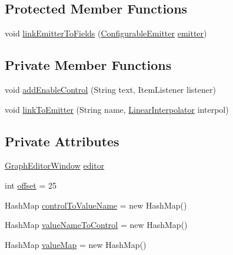 \subsection*{Protected Member Functions}
\begin{DoxyCompactItemize}
\item 
void \mbox{\hyperlink{classorg_1_1newdawn_1_1slick_1_1tools_1_1peditor_1_1_whiskas_panel_a71a90d8afe5a7f2eefc72aecc4b07640}{link\+Emitter\+To\+Fields}} (\mbox{\hyperlink{classorg_1_1newdawn_1_1slick_1_1particles_1_1_configurable_emitter}{Configurable\+Emitter}} \mbox{\hyperlink{classorg_1_1newdawn_1_1slick_1_1tools_1_1peditor_1_1_control_panel_aaa170169fa574cb6b271f782afcd2517}{emitter}})
\end{DoxyCompactItemize}
\subsection*{Private Member Functions}
\begin{DoxyCompactItemize}
\item 
void \mbox{\hyperlink{classorg_1_1newdawn_1_1slick_1_1tools_1_1peditor_1_1_whiskas_panel_aa9cd100f0001b41516cb06b9c6903b7a}{add\+Enable\+Control}} (String text, Item\+Listener listener)
\item 
void \mbox{\hyperlink{classorg_1_1newdawn_1_1slick_1_1tools_1_1peditor_1_1_whiskas_panel_aa8fd4ce760ea12d13153842f6dc4c902}{link\+To\+Emitter}} (String name, \mbox{\hyperlink{classorg_1_1newdawn_1_1slick_1_1particles_1_1_configurable_emitter_1_1_linear_interpolator}{Linear\+Interpolator}} interpol)
\end{DoxyCompactItemize}
\subsection*{Private Attributes}
\begin{DoxyCompactItemize}
\item 
\mbox{\hyperlink{classorg_1_1newdawn_1_1slick_1_1tools_1_1peditor_1_1_graph_editor_window}{Graph\+Editor\+Window}} \mbox{\hyperlink{classorg_1_1newdawn_1_1slick_1_1tools_1_1peditor_1_1_whiskas_panel_adafc0fc72d0d368d6298c3c44e4fa96c}{editor}}
\item 
int \mbox{\hyperlink{classorg_1_1newdawn_1_1slick_1_1tools_1_1peditor_1_1_whiskas_panel_a56716629f78624b7be34453302c0699c}{offset}} = 25
\item 
Hash\+Map \mbox{\hyperlink{classorg_1_1newdawn_1_1slick_1_1tools_1_1peditor_1_1_whiskas_panel_adff62f4a99ab444f80c37b40d9ff0489}{control\+To\+Value\+Name}} = new Hash\+Map()
\item 
Hash\+Map \mbox{\hyperlink{classorg_1_1newdawn_1_1slick_1_1tools_1_1peditor_1_1_whiskas_panel_a299a865d47b6d893171286b501af69cb}{value\+Name\+To\+Control}} = new Hash\+Map()
\item 
Hash\+Map \mbox{\hyperlink{classorg_1_1newdawn_1_1slick_1_1tools_1_1peditor_1_1_whiskas_panel_a952aebc524d9c88dc4dc7bb7e2231fd1}{value\+Map}} = new Hash\+Map()
\end{DoxyCompactItemize}
